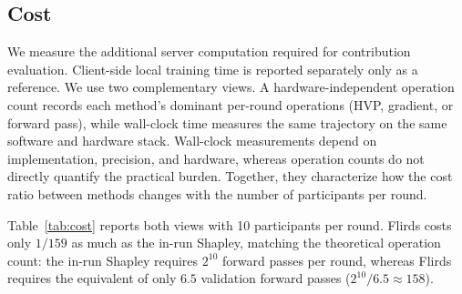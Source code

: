 \documentclass[letterpaper]{article} %
\theoremstyle{definition} %
\begin{document}
\subsection{Cost}
\label{sec:cost}

We measure the additional server computation required for contribution
evaluation. Client-side local training time is reported separately only as a
reference. We use two complementary views. A hardware-independent operation
count records each method's dominant per-round operations (HVP, gradient, or
forward pass), while wall-clock time measures the same trajectory on the same
software and hardware stack. Wall-clock measurements depend on implementation,
precision, and hardware, whereas operation counts do not directly quantify
the practical burden. Together, they characterize how the cost ratio between
methods changes with the number of participants per round.

Table~\ref{tab:cost} reports both views with 10 participants per round. Flirds costs only $1/159$ as much as the in-run Shapley, matching the
theoretical operation count: the in-run Shapley requires $2^{10}$ forward
passes per round, whereas Flirds requires the equivalent of only $6.5$
validation forward passes ($2^{10}/6.5 \approx 158$).



\end{document}
